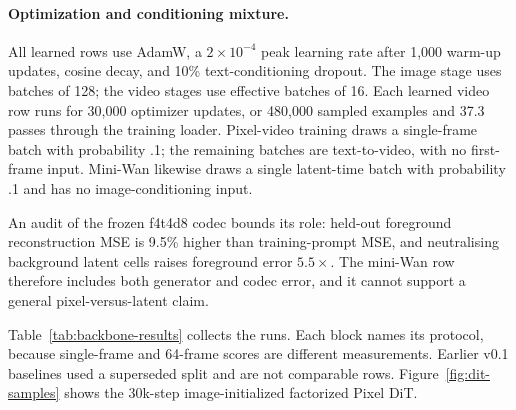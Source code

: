 \documentclass[10pt,twocolumn,letterpaper]{article}
\begin{document}
\paragraph{Optimization and conditioning mixture.} All learned rows use AdamW, a $2\times10^{-4}$ peak
learning rate after 1{,}000 warm-up updates, cosine decay, and 10\% text-conditioning dropout. The image
stage uses batches of 128; the video stages use effective batches of 16. Each learned video row runs for
30{,}000 optimizer updates, or 480{,}000 sampled examples and 37.3 passes through the training loader.
Pixel-video training draws a single-frame batch with probability .1; the remaining batches are
text-to-video, with no first-frame input. Mini-Wan likewise draws a single latent-time batch with
probability .1 and has no image-conditioning input.

An audit of the frozen f4t4d8 codec bounds its role: held-out foreground reconstruction MSE is 9.5\% higher
than training-prompt MSE, and neutralising background latent cells raises foreground error $5.5\times$. The
mini-Wan row therefore includes both generator and codec error, and it cannot support a general
pixel-versus-latent claim.

Table~\ref{tab:backbone-results} collects the runs. Each block names its protocol, because single-frame and
64-frame scores are different measurements. Earlier v0.1 baselines used a superseded split and are not
comparable rows. Figure~\ref{fig:dit-samples} shows the 30k-step image-initialized factorized Pixel DiT.
\end{document}
